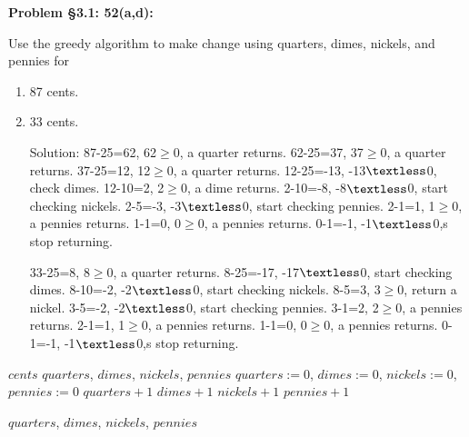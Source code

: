 \documentclass{article}
\newenvironment{problem}[1]
{\begin{mdframed}[default]
\textbf{Problem #1:}
}
{\end{mdframed}
}
\begin{document}
\begin{problem}{\S 3.1: 52(a,d)}
Use the greedy algorithm to make change using quarters, dimes, nickels, and pennies
for
\begin{enumerate}
\item[(a)] 87 cents.
\item[(d)] 33 cents.

Solution:
87-25=62, 62$\geq$0, a quarter returns. 62-25=37, 37$\geq$0, a quarter returns. 37-25=12, 12$\geq$0, a quarter returns.
 12-25=-13, -13$\textless$0, check dimes.
12-10=2, 2$\geq$0, a dime returns. 2-10=-8, -8$\textless$0, start checking nickels. 2-5=-3, -3$\textless$0, start checking pennies.
2-1=1, 1$\geq$0, a pennies returns. 1-1=0, 0$\geq$0, a pennies returns. 0-1=-1, -1$\textless$0,s stop returning.

33-25=8, 8$\geq$0, a quarter returns. 8-25=-17, -17$\textless$0, start checking dimes.
8-10=-2, -2$\textless$0, start checking nickels. 8-5=3, 3$\geq$0, return a nickel. 3-5=-2, -2$\textless$0, start checking pennies.
3-1=2, 2$\geq$0, a pennies returns. 2-1=1, 1$\geq$0, a pennies returns. 1-1=0, 0$\geq$0, a pennies returns. 0-1=-1, -1$\textless$0,s stop returning.

\end{enumerate}
\end{problem}
\begin{algorithm}[]
    \caption{Algorithm of Problem \S 3.1:52}
    \label{alg:AOS}
    \renewcommand{\algorithmicrequire}{\textbf{Input:}}
    \renewcommand{\algorithmicensure}{\textbf{Output:}}
    
    \begin{algorithmic}[1]
        \REQUIRE $cents$ %
        \ENSURE $quarters$, $dimes$, $nickels$, $pennies$    %
        \STATE $quarters:=0$, $dimes:=0$, $nickels:=0$, $pennies:=0$
            \STATE $quarters+1$
        \ENDWHILE
            \STATE $dimes+1$
        \ENDWHILE
        \STATE $nickels+1$
        \ENDWHILE
            \STATE $pennies+1$
        \ENDWHILE
    
        
        \RETURN $quarters$, $dimes$, $nickels$, $pennies$
    \end{algorithmic}
\end{algorithm}
\end{document}
